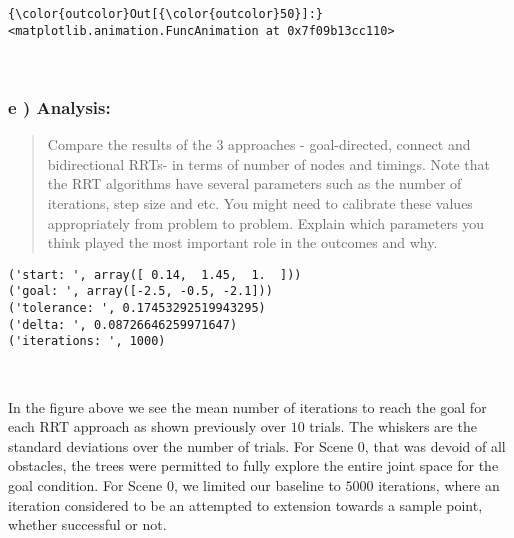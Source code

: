 \documentclass{article}
\begin{document}
            \begin{Verbatim}[commandchars=\\\{\}]
{\color{outcolor}Out[{\color{outcolor}50}]:} <matplotlib.animation.FuncAnimation at 0x7f09b13cc110>
\end{Verbatim}
        
    \begin{center}
    \end{center}
    { \hspace*{\fill} \\}
    

    \subsubsection{e ) Analysis:}


    \begin{quote}
Compare the results of the 3 approaches - goal-directed, connect and
bidirectional RRTs- in terms of number of nodes and timings. Note that
the RRT algorithms have several parameters such as the number of
iterations, step size and etc. You might need to calibrate these values
appropriately from problem to problem. Explain which parameters you
think played the most important role in the outcomes and why.
\end{quote}


    \begin{Verbatim}[commandchars=\\\{\}]
('start: ', array([ 0.14,  1.45,  1.  ]))
('goal: ', array([-2.5, -0.5, -2.1]))
('tolerance: ', 0.17453292519943295)
('delta: ', 0.08726646259971647)
('iterations: ', 1000)
    \end{Verbatim}



    \begin{center}
    \end{center}
    { \hspace*{\fill} \\}
    
    In the figure above we see the mean number of iterations to reach the
goal for each RRT approach as shown previously over $10$ trials. The
whiskers are the standard deviations over the number of trials. For
Scene 0, that was devoid of all obstacles, the trees were permitted to
fully explore the entire joint space for the goal condition. For Scene
0, we limited our baseline to $5000$ iterations, where an iteration
considered to be an attempted to extension towards a sample point,
whether successful or not.
\end{document}
